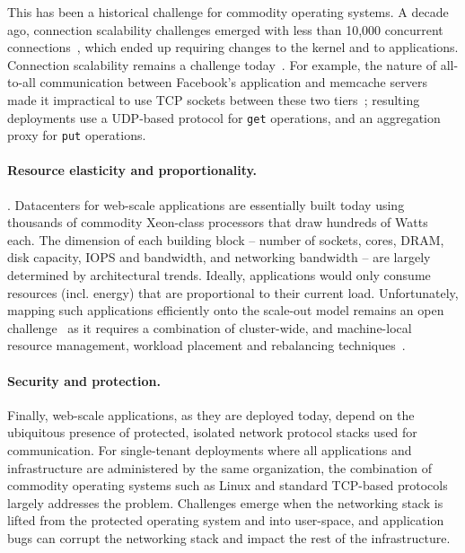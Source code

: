 This has been a historical challenge for commodity operating systems.
A decade ago, connection scalability challenges emerged with less than
10,000 concurrent connections~\cite{theC10Kproblem}, which ended up
requiring changes to the kernel and to applications.  Connection
scalability remains a challenge today~\cite{theC10Mproblem}.  For
example, the nature of all-to-all communication between Facebook's
application and memcache servers made it impractical to use TCP
sockets between these two tiers~\cite{nishtala2013scaling}; resulting
deployments use a UDP-based protocol for \texttt{get} operations, and
an aggregation proxy for \texttt{put} operations.


\paragraph{Resource elasticity and proportionality.}

. Datacenters for web-scale applications are
essentially built today using thousands of commodity Xeon-class
processors that draw hundreds of Watts each.  The dimension of each
building block -- number of sockets, cores, DRAM, disk capacity, IOPS
and bandwidth, and networking bandwidth -- are largely determined by
architectural trends.  Ideally, applications would only consume
resources (incl. energy) that are proportional to their current load.
Unfortunately, mapping such applications efficiently onto the
scale-out model remains an open challenge~\cite{missing} as it requires
a combination of cluster-wide, and machine-local resource management,
workload placement and rebalancing techniques~\cite{missing,missing}.


\paragraph{Security and protection.}

Finally, web-scale applications, as they are deployed today, depend on
the ubiquitous presence of protected, isolated network protocol
stacks used for communication.  For single-tenant deployments where
all applications and infrastructure are administered by the same
organization, the combination of commodity operating systems such as
Linux and standard TCP-based protocols largely addresses the problem.
Challenges emerge when the networking stack is lifted from the
protected operating system and into user-space, and application bugs
can corrupt the networking stack and impact the rest of the
infrastructure.


